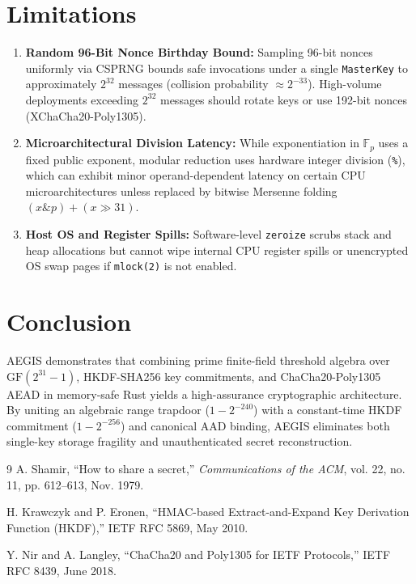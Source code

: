 \documentclass[11pt,a4paper]{article}
\theoremstyle{definition}
\newcommand{\Fp}{\mathbb{F}_p}
\begin{document}
\section{Limitations}

\begin{enumerate}[label=(\arabic*)]
    \item \textbf{Random 96-Bit Nonce Birthday Bound:} Sampling 96-bit nonces uniformly via CSPRNG bounds safe invocations under a single \texttt{MasterKey} to approximately $2^{32}$ messages (collision probability $\approx 2^{-33}$). High-volume deployments exceeding $2^{32}$ messages should rotate keys or use 192-bit nonces (XChaCha20-Poly1305).
    \item \textbf{Microarchitectural Division Latency:} While exponentiation in $\Fp$ uses a fixed public exponent, modular reduction uses hardware integer division (\texttt{\%}), which can exhibit minor operand-dependent latency on certain CPU microarchitectures unless replaced by bitwise Mersenne folding $(x \mathbin{\&} p) + (x \gg 31)$.
    \item \textbf{Host OS and Register Spills:} Software-level \texttt{zeroize} scrubs stack and heap allocations but cannot wipe internal CPU register spills or unencrypted OS swap pages if \texttt{mlock(2)} is not enabled.
\end{enumerate}

\section{Conclusion}

AEGIS demonstrates that combining prime finite-field threshold algebra over $\mathrm{GF}(2^{31}-1)$, HKDF-SHA256 key commitments, and ChaCha20-Poly1305 AEAD in memory-safe Rust yields a high-assurance cryptographic architecture. By uniting an algebraic range trapdoor ($1 - 2^{-240}$) with a constant-time HKDF commitment ($1 - 2^{-256}$) and canonical AAD binding, AEGIS eliminates both single-key storage fragility and unauthenticated secret reconstruction.

\begin{thebibliography}{9}
A. Shamir, ``How to share a secret,'' \emph{Communications of the ACM}, vol. 22, no. 11, pp. 612--613, Nov. 1979.

H. Krawczyk and P. Eronen, ``HMAC-based Extract-and-Expand Key Derivation Function (HKDF),'' IETF RFC 5869, May 2010.

Y. Nir and A. Langley, ``ChaCha20 and Poly1305 for IETF Protocols,'' IETF RFC 8439, June 2018.
\end{thebibliography}
\end{document}
